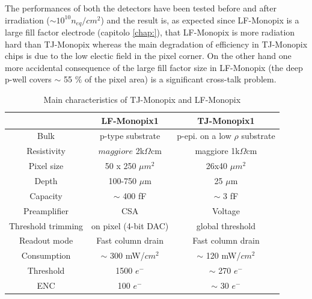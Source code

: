 The performances of both the detectors have been tested before and after irradiation ($\sim 10^{10} n_{eq}/cm^{2}$) and the result is, as expected since LF-Monopix is a large fill factor electrode (capitolo \ref{chap:}), that LF-Monopix is more radiation hard than TJ-Monopix whereas the main degradation of efficiency in TJ-Monopix chips is due to the low electic field in the pixel corner. On the other hand one more accidental consequence of the large fill factor size in LF-Monopix (the deep p-well covers $\sim$ 55 $\%$ of the pixel area) is a significant cross-talk problem.
\begin{table}
    \begin{center}
    \begin{tabular}{|c | c |c |}
    \hline
    & LF-Monopix1 & TJ-Monopix1\\
    \hline
    \hline
    Bulk & p-type substrate & p-epi. on a low $\rho$ substrate \\
    Resistivity & $maggiore$ 2k$\Omega$cm & maggiore 1k$\Omega$cm\\
    Pixel size & 50 x 250 $\mu m^2$ & 26x40 $\mu m^2$ \\
    Depth & 100-750 $\mu$m & 25 $\mu$m \\
    Capacity & $\sim$ 400 fF & $\sim$ 3 fF\\
    Preamplifier & CSA & Voltage \\
    Threshold trimming & on pixel (4-bit DAC) & global threshold\\
    Readout mode & Fast column drain & Fast column drain\\
    Consumption & $\sim$ 300 mW/$cm^2$& $\sim$ 120 mW/$cm^2$ \\
    Threshold & 1500 $e^-$ & $\sim$ 270 $e^-$ \\
    ENC & 100 $e^-$ & $\sim$ 30 $e^-$\\
    \hline
    \end{tabular}
    \caption{Main characteristics of TJ-Monopix and LF-Monopix \cite{LF-TJ-Monopix}}
    \label{tab:LF-TJ-Monopix}
    \end{center}
 \end{table}

